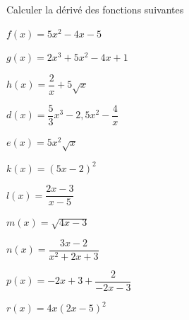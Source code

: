 \documentclass[12pt,a4paper]{article}  %
\begin{document}

Calculer la dérivé des fonctions suivantes
\begin{enumMet}
    \item $f(x)=5 x^{2}-4 x-5$
    \item $g(x)=2 x^{3}+5 x^{2}-4 x+1$
    \item $h(x)=\dfrac{2}{x}+5 \sqrt{x}$
    \item $d(x)=\dfrac{5}{3} x^{3}-2,5 x^{2}-\dfrac{4}{x}$
    \item $e(x)=5 x^{2} \sqrt{x}$
    \item $k(x)=(5 x-2)^{2}$
    \item $l(x)=\dfrac{2 x-3}{x-5}$
    \item $m(x)=\sqrt{4 x-3}$
    \item $n(x)=\dfrac{3 x-2}{x^2+2x+3}$
    \item $p(x)=-2x+3+\dfrac{2}{-2x-3}$
    \item $r(x)=4x(2x-5)^2$
\end{enumMet}
\end{document}
